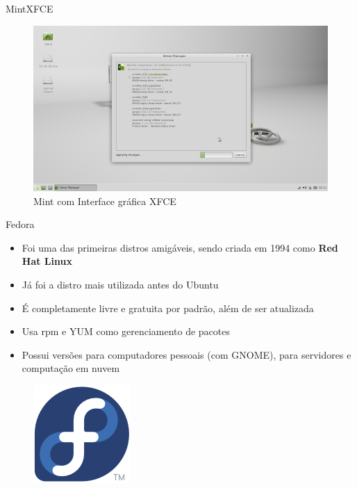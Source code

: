 \documentclass{beamer}
\begin{document}
\begin{frame}{Mint}{XFCE}
 \begin{figure}[h!]
        \centering
        \includegraphics[scale=0.4]{MintXFCE.png}
        \caption{Mint com Interface gráfica XFCE}
        \label{fig:Comando ls}
    \end{figure}
\end{frame}

\begin{frame}{Fedora}
    \begin{itemize}
        \item{Foi uma das primeiras distros amigáveis, sendo criada em 1994 como \textbf{Red Hat Linux}}
        \item{Já foi a distro mais utilizada antes do Ubuntu}
        \item{É completamente livre e gratuita por padrão, além de ser atualizada}
        \item{Usa rpm e YUM como gerenciamento de pacotes}
        \item{Possui versões para computadores pessoais (com GNOME), para servidores e computação em nuvem}
    \end{itemize}
    \begin{figure}[h!]
        \centering
        \includegraphics[scale=0.42]{fedora.png}
    \end{figure}
\end{frame}
\end{document}
